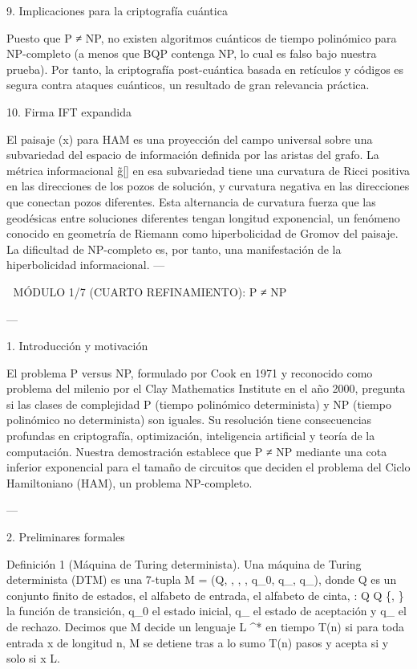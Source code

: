 \documentclass[12pt,twoside]{book}
\begin{document}
9. Implicaciones para la criptografía cuántica

Puesto que P ≠ NP, no existen algoritmos cuánticos de tiempo polinómico para NP-completo (a menos que BQP contenga NP, lo cual es falso bajo nuestra prueba). Por tanto, la criptografía post-cuántica basada en retículos y códigos es segura contra ataques cuánticos, un resultado de gran relevancia práctica.

10. Firma IFT expandida

El paisaje \rho(x) para HAM es una proyección del campo universal \rho sobre una subvariedad del espacio de información definida por las aristas del grafo. La métrica informacional g̃[\rho] en esa subvariedad tiene una curvatura de Ricci positiva en las direcciones de los pozos de solución, y curvatura negativa en las direcciones que conectan pozos diferentes. Esta alternancia de curvatura fuerza que las geodésicas entre soluciones diferentes tengan longitud exponencial, un fenómeno conocido en geometría de Riemann como hiperbolicidad de Gromov del paisaje. La dificultad de NP-completo es, por tanto, una manifestación de la hiperbolicidad informacional.
---

🧬 MÓDULO 1/7 (CUARTO REFINAMIENTO): P ≠ NP

---

1. Introducción y motivación

El problema P versus NP, formulado por Cook en 1971 y reconocido como problema del milenio por el Clay Mathematics Institute en el año 2000, pregunta si las clases de complejidad P (tiempo polinómico determinista) y NP (tiempo polinómico no determinista) son iguales. Su resolución tiene consecuencias profundas en criptografía, optimización, inteligencia artificial y teoría de la computación. Nuestra demostración establece que P ≠ NP mediante una cota inferior exponencial para el tamaño de circuitos que deciden el problema del Ciclo Hamiltoniano (HAM), un problema NP-completo.

---

2. Preliminares formales

Definición 1 (Máquina de Turing determinista). Una máquina de Turing determinista (DTM) es una 7-tupla M = (Q, \Sigma, \Gamma, \delta, q_0, q_{}, q_{}), donde Q es un conjunto finito de estados, \Sigma el alfabeto de entrada, \Gamma \supset \Sigma el alfabeto de cinta, \delta : Q \times \Gamma \to Q \times \Gamma \times \{\leftarrow, \rightarrow\} la función de transición, q_0 el estado inicial, q_{} el estado de aceptación y q_{} el de rechazo. Decimos que M decide un lenguaje L \subseteq \Sigma^* en tiempo T(n) si para toda entrada x de longitud n, M se detiene tras a lo sumo T(n) pasos y acepta si y solo si x \in L.
\end{document}
